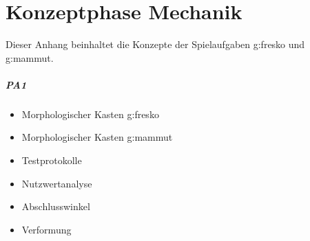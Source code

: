 %
%
\chapter{Konzeptphase Mechanik}\label{ch:konzeptphase_mechanik}
	Dieser Anhang beinhaltet die Konzepte der Spielaufgaben \gls{g:fresko} und \gls{g:mammut}.
	\paragraph{PA1}
	\begin{itemize}
		\item Morphologischer Kasten \gls{g:fresko}
		\item Morphologischer Kasten \gls{g:mammut}
		\item Testprotokolle
		\item Nutzwertanalyse
		\item Abschlusswinkel
		\item Verformung
	\end{itemize}
